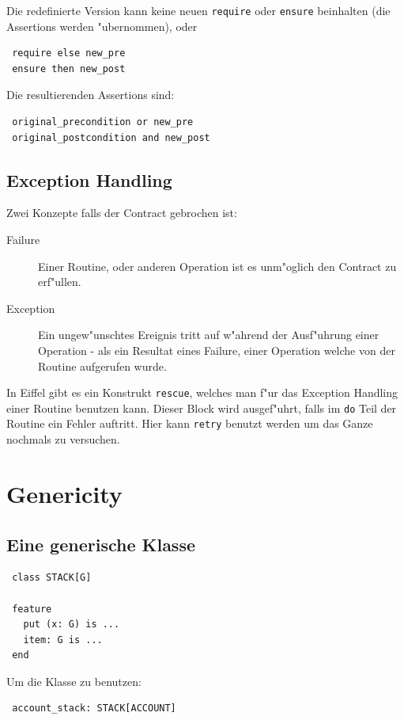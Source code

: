 \documentclass[german, 10pt, a4paper, twocolumn]{scrartcl}
\theoremstyle{definition}
\begin{document}
Die redefinierte Version kann keine neuen \verb#require# oder \verb#ensure# beinhalten (die Assertions werden "ubernommen), oder
\begin{verbatim}
 require else new_pre
 ensure then new_post
\end{verbatim}

Die resultierenden Assertions sind:
\begin{verbatim}
 original_precondition or new_pre
 original_postcondition and new_post
\end{verbatim}

\subsection{Exception Handling}

Zwei Konzepte falls der Contract gebrochen ist:
\begin{description}
	\item[Failure] Einer Routine, oder anderen Operation ist es unm"oglich den Contract zu erf"ullen.
	\item[Exception] Ein ungew"unschtes Ereignis tritt auf w"ahrend der Ausf"uhrung einer Operation - als ein Resultat eines Failure, einer Operation welche von der Routine aufgerufen wurde.
\end{description}

In Eiffel gibt es ein Konstrukt \verb#rescue#, welches man f"ur das Exception Handling einer Routine benutzen kann. Dieser Block wird ausgef"uhrt, falls im \verb#do# Teil der Routine ein Fehler auftritt. Hier kann \verb#retry# benutzt werden um das Ganze nochmals zu versuchen.

\section{Genericity}

\subsection{Eine generische Klasse}

\begin{verbatim}
 class STACK[G]

 feature
   put (x: G) is ...
   item: G is ...
 end
\end{verbatim}

Um die Klasse zu benutzen:
\begin{verbatim}
 account_stack: STACK[ACCOUNT]
\end{verbatim}
\end{document}
